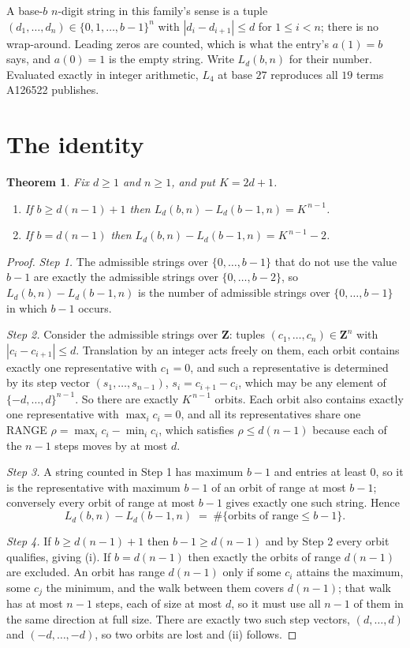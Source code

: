 \documentclass[11pt,a4paper]{article}
\theoremstyle{plain}
\newtheorem{theorem}{Theorem}
\theoremstyle{definition}
\begin{document}
A base-$b$ $n$-digit string in this family's sense is a tuple
$(d_1,\dots,d_n)\in\{0,1,\dots,b-1\}^{n}$ with $|d_i-d_{i+1}|\le d$ for $1\le i<n$; there
is no wrap-around. Leading zeros are counted, which is what the entry's $a(1)=b$ says, and
$a(0)=1$ is the empty string. Write $L_d(b,n)$ for their number. Evaluated exactly in integer
arithmetic, $L_{4}$ at base $27$ reproduces all $19$ terms A126522 publishes.

\section{The identity}

\begin{theorem}
Fix $d\ge1$ and $n\ge1$, and put $K=2d+1$.
\begin{enumerate}
\item[(i)] If $b\ge d(n-1)+1$ then $L_d(b,n)-L_d(b-1,n)=K^{\,n-1}$.
\item[(ii)] If $b=d(n-1)$ then $L_d(b,n)-L_d(b-1,n)=K^{\,n-1}-2$.
\end{enumerate}
\end{theorem}

\begin{proof}
\emph{Step 1.} The admissible strings over $\{0,\dots,b-1\}$ that do not use the value $b-1$
are exactly the admissible strings over $\{0,\dots,b-2\}$, so $L_d(b,n)-L_d(b-1,n)$ is the
number of admissible strings over $\{0,\dots,b-1\}$ in which $b-1$ occurs.

\emph{Step 2.} Consider the admissible strings over $\mathbf{Z}$: tuples
$(c_1,\dots,c_n)\in\mathbf{Z}^{n}$ with $|c_i-c_{i+1}|\le d$. Translation by an integer acts
freely on them, each orbit contains exactly one representative with $c_1=0$, and such a
representative is determined by its step vector $(s_1,\dots,s_{n-1})$, $s_i=c_{i+1}-c_i$,
which may be any element of $\{-d,\dots,d\}^{n-1}$. So there are exactly $K^{\,n-1}$ orbits.
Each orbit also contains exactly one representative with $\max_i c_i=0$, and all its
representatives share one RANGE $\rho=\max_ic_i-\min_ic_i$, which satisfies
$\rho\le d(n-1)$ because each of the $n-1$ steps moves by at most $d$.

\emph{Step 3.} A string counted in Step 1 has maximum $b-1$ and entries at least $0$, so it is
the representative with maximum $b-1$ of an orbit of range at most $b-1$; conversely every orbit
of range at most $b-1$ gives exactly one such string. Hence
\[
L_d(b,n)-L_d(b-1,n)\;=\;\#\{\text{orbits of range}\le b-1\} .
\]

\emph{Step 4.} If $b\ge d(n-1)+1$ then $b-1\ge d(n-1)$ and by Step 2 every orbit qualifies,
giving (i). If $b=d(n-1)$ then exactly the orbits of range $d(n-1)$ are excluded. An orbit has
range $d(n-1)$ only if some $c_i$ attains the maximum, some $c_j$ the minimum, and the walk
between them covers $d(n-1)$; that walk has at most $n-1$ steps, each of size at most $d$, so it
must use all $n-1$ of them in the same direction at full size. There are exactly two such step
vectors, $(d,\dots,d)$ and $(-d,\dots,-d)$, so two orbits are lost and (ii) follows.
\end{proof}
\end{document}
